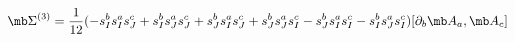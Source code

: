 \begin{equation}
{\mb \Sigma}^{(3)}=\frac{1}{12}(-s^{b}_{I}s^{a}_{I}s^{c}_{J}+s^{b}_{I}s^{a}_{J}s^{c}_{J}+s^{b}_{J}s^{a}_{I}s^{c}_{J}+s^{b}_{J}s^{a}_{J}s^{c}_{I}-s^{b}_{J}s^{a}_{I}s^{c}_{I}-s^{b}_{I}s^{a}_{J}s^{c}_{I})[\partial_{b}{\mb A}_{a},{\mb A}_{c}]
\label{NCFGK}
\end{equation}

